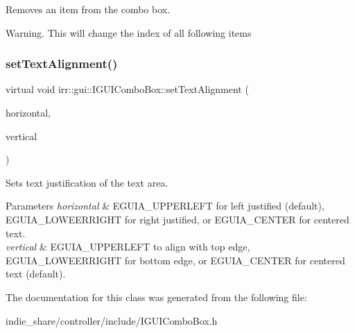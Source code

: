 Removes an item from the combo box. 

Warning. This will change the index of all following items \mbox{\label{classirr_1_1gui_1_1IGUIComboBox_a902681b9cfc783d29270f919ab3e71d8}} 
\subsubsection{\texorpdfstring{set\+Text\+Alignment()}{setTextAlignment()}}
{\footnotesize\ttfamily virtual void irr\+::gui\+::\+I\+G\+U\+I\+Combo\+Box\+::set\+Text\+Alignment (\begin{DoxyParamCaption}\item[{\hyperlink{namespaceirr_1_1gui_a19eb5fb40e67f108cb16aba922ddaa2d}{E\+G\+U\+I\+\_\+\+A\+L\+I\+G\+N\+M\+E\+NT}}]{horizontal,  }\item[{\hyperlink{namespaceirr_1_1gui_a19eb5fb40e67f108cb16aba922ddaa2d}{E\+G\+U\+I\+\_\+\+A\+L\+I\+G\+N\+M\+E\+NT}}]{vertical }\end{DoxyParamCaption})\hspace{0.3cm}{\ttfamily [pure virtual]}}



Sets text justification of the text area. 


\begin{DoxyParams}{Parameters}
{\em horizontal} & E\+G\+U\+I\+A\+\_\+\+U\+P\+P\+E\+R\+L\+E\+FT for left justified (default), E\+G\+U\+I\+A\+\_\+\+L\+O\+W\+E\+E\+R\+R\+I\+G\+HT for right justified, or E\+G\+U\+I\+A\+\_\+\+C\+E\+N\+T\+ER for centered text. \\
\hline
{\em vertical} & E\+G\+U\+I\+A\+\_\+\+U\+P\+P\+E\+R\+L\+E\+FT to align with top edge, E\+G\+U\+I\+A\+\_\+\+L\+O\+W\+E\+E\+R\+R\+I\+G\+HT for bottom edge, or E\+G\+U\+I\+A\+\_\+\+C\+E\+N\+T\+ER for centered text (default). \\
\hline
\end{DoxyParams}


The documentation for this class was generated from the following file\+:\begin{DoxyCompactItemize}
\item 
indie\+\_\+share/controller/include/I\+G\+U\+I\+Combo\+Box.\+h\end{DoxyCompactItemize}
